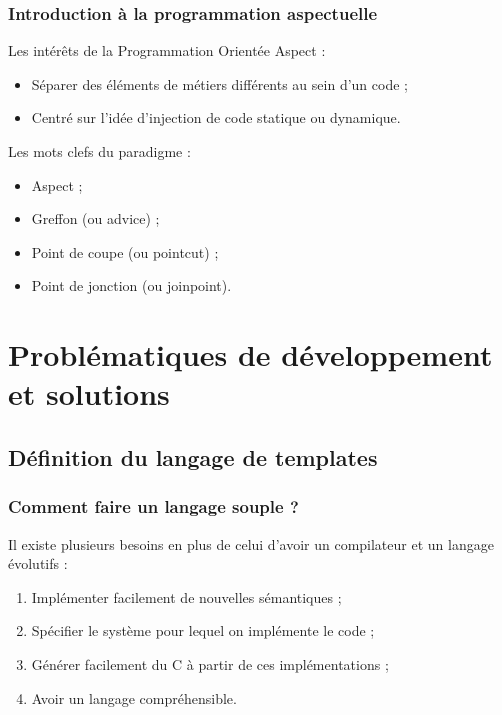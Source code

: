 \documentclass[]{beamer}
\begin{document}
\begin{frame}
\begin{columns}[c]
\end{columns}
\end{frame}

\begin{frame}
\frametitle{Introduction à la programmation aspectuelle}
 {
    Les intérêts de la Programmation Orientée Aspect :
    \begin{itemize}
        \item Séparer des éléments de métiers différents au sein d'un code ;
        \item Centré sur l'idée d'injection de code statique ou dynamique.
    \end{itemize}
}
 {
    Les mots clefs du paradigme :
    \begin{itemize}
        \item Aspect ;
        \item Greffon (ou advice) ;
        \item Point de coupe (ou pointcut) ;
        \item Point de jonction (ou joinpoint).
    \end{itemize}
}
\end{frame}

\section{Problématiques de développement et solutions}

\subsection{Définition du langage de templates}
\begin{frame}
\frametitle{Comment faire un langage souple ?}
Il existe plusieurs besoins en plus de celui d'avoir un compilateur et un
langage évolutifs :
\begin{enumerate}[<+->]
    \item Implémenter facilement de nouvelles sémantiques ;
    \item Spécifier le système pour lequel on implémente le code ;
    \item Générer facilement du C à partir de ces implémentations ;
    \item Avoir un langage compréhensible.
\end{enumerate}
\end{frame}
\end{document}
